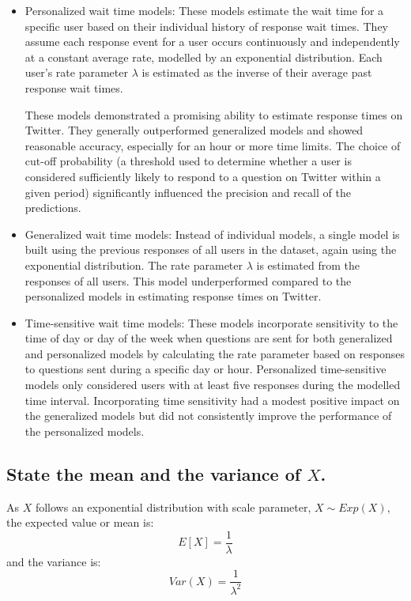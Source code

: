 \documentclass[]{article}
\begin{document}
\begin{itemize}
	\item Personalized wait time models: These models estimate the wait time for a specific user based on their individual history of response wait times. They assume each response event for a user occurs continuously and independently at a constant average rate, modelled by an exponential distribution. Each user's rate parameter $\lambda$ is estimated as the inverse of their average past response wait times.
	
	These models demonstrated a promising ability to estimate response times on Twitter. They generally outperformed generalized models and showed reasonable accuracy, especially for an hour or more time limits. The choice of cut-off probability (a threshold used to determine whether a user is considered sufficiently likely to respond to a question on Twitter within a given period) significantly influenced the precision and recall of the predictions.
	
	\item Generalized wait time models: Instead of individual models, a single model is built using the previous responses of all users in the dataset, again using the exponential distribution. The rate parameter $\lambda$ is estimated from the responses of all users. This model underperformed compared to the personalized models in estimating response times on Twitter.
	
	
	\item Time-sensitive wait time models: These models incorporate sensitivity to the time of day or day of the week when questions are sent for both generalized and personalized models by calculating the rate parameter based on responses to questions sent during a specific day or hour. Personalized time-sensitive models only considered users with at least five responses during the modelled time interval. Incorporating time sensitivity had a modest positive impact on the generalized models but did not consistently improve the performance of the personalized models.
\end{itemize}


\subsection{State the mean and the variance of $X$.}

As $X$ follows an exponential distribution with scale parameter, $X \sim Exp(X)$, the expected value or mean is:
\begin{equation}
	E[X] = \frac{1}{\lambda}
\end{equation}
and the variance is:
\begin{equation}
	Var(X) = \frac{1}{\lambda^2}
\end{equation}
\end{document}
